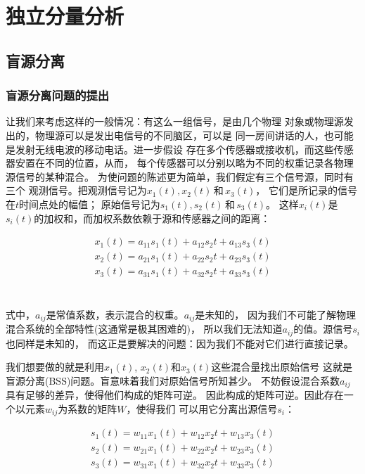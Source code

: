 ﻿%

\chapter{独立分量分析}
\label{chap02}
\section{盲源分离\cite{AAPO01}}

\subsection{盲源分离问题的提出}
    让我们来考虑这样的一般情况：有这么一组信号，是由几个物理
对象或物理源发出的，物理源可以是发出电信号的不同脑区，可以是
同一房间讲话的人，也可能是发射无线电波的移动电话。进一步假设
存在多个传感器或接收机，而这些传感器安置在不同的位置，从而，
每个传感器可以分别以略为不同的权重记录各物理源信号的某种混合。
    为使问题的陈述更为简单，我们假定有三个信号源，同时有三个
观测信号。把观测信号记为$x_1(t), x_2(t) \,\mbox{和}\, x_3(t)$，
它们是所记录的信号在$t$时间点处的幅值；
原始信号记为$s_1(t), s_2(t)\,和\,s_3(t)$。
这样$x_i(t)$是$s_i(t)$的加权和，而加权系数依赖于源和传感器之间的距离：

\parbox{10cm}{
\begin{eqnarray*}
x_1(t)=a_{11}s_1(t)+a_{12}s_2{t}+a_{13}s_3(t) \\
x_2(t)=a_{21}s_1(t)+a_{22}s_2{t}+a_{23}s_3(t) \\
x_3(t)=a_{31}s_1(t)+a_{32}s_2{t}+a_{33}s_3(t) \\
\end{eqnarray*}
}\hfill
\parbox{3cm}{\begin{eqnarray} \label{bss_compose}\end{eqnarray}}

式中，$a_{ij}$是常值系数，表示混合的权重。$a_{ij}$是未知的，
因为我们不可能了解物理混合系统的全部特性(这通常是极其困难的)，
所以我们无法知道$a_{ij}$的值。源信号$s_i$也同样是未知的，
而这正是要解决的问题：因为我们不能对它们进行直接记录。
    
我们想要做的就是利用$x_1(t)$, $x_2(t)$和$x_3(t)$这些混合量找出原始信号
这就是盲源分离(BSS)问题。盲意味着我们对原始信号所知甚少。
    不妨假设混合系数$a_{ij}$具有足够的差异，使得他们构成的矩阵可逆。
因此构成的矩阵可逆。因此存在一个以元素$w_{ij}$为系数的矩阵$W$，使得我们
可以用它分离出源信号$s_i$：
 
\parbox{10cm}{
\begin{eqnarray*}
s_1(t)=w_{11}x_1(t)+w_{12}x_2{t}+w_{13}x_3(t) \\
s_2(t)=w_{21}x_1(t)+w_{22}x_2{t}+w_{23}x_3(t) \\
s_3(t)=w_{31}x_1(t)+w_{32}x_2{t}+w_{33}x_3(t) \\
\end{eqnarray*}
}\hfill
\parbox{3cm}{\begin{eqnarray}\label{bss_slover} \end{eqnarray}}

